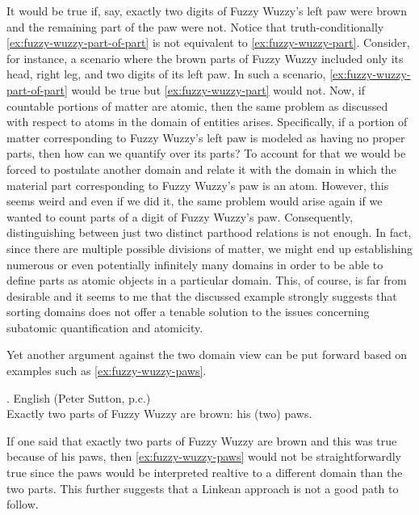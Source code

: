 	It would be true if, say, exactly two digits of Fuzzy Wuzzy's left paw were brown and the remaining part of the paw were not. Notice that truth-conditionally \ref{ex:fuzzy-wuzzy-part-of-part} is not equivalent to \ref{ex:fuzzy-wuzzy-part}. Consider, for instance, a scenario where the brown parts of Fuzzy Wuzzy included only its head, right leg, and two digits of its left paw. In such a scenario, \ref{ex:fuzzy-wuzzy-part-of-part} would be true but \ref{ex:fuzzy-wuzzy-part} would not. Now, if countable portions of matter are atomic, then the same problem as discussed with respect to atoms in the domain of entities arises. Specifically, if a portion of matter corresponding to Fuzzy Wuzzy's left paw is modeled as having no proper parts, then how can we quantify over its parts? To account for that we would be forced to postulate another domain and relate it with the domain in which the material part corresponding to Fuzzy Wuzzy's paw is an atom. However, this seems weird and even if we did it, the same problem would arise again if we wanted to count parts of a digit of Fuzzy Wuzzy's paw. Consequently, distinguishing between just two distinct parthood relations is not enough. In fact, since there are multiple possible divisions of matter, we might end up establishing numerous or even potentially infinitely many domains in order to be able to define parts as atomic objects in a particular domain. This, of course, is far from desirable and it seems to me that the discussed example strongly suggests that sorting domains does not offer a tenable solution to the issues concerning subatomic quantification and atomicity.
	
	Yet another argument against the two domain view can be put forward based on examples such as \ref{ex:fuzzy-wuzzy-paws}.
	
	    \ex. English (Peter Sutton, p.c.)\\
    Exactly two parts of Fuzzy Wuzzy are brown: his (two) paws.\label{ex:fuzzy-wuzzy-paws} 

    If one said that exactly two parts of Fuzzy Wuzzy are brown and this was true because of his paws, then \ref{ex:fuzzy-wuzzy-paws} would not be straightforwardly true since the paws would be interpreted realtive to a different domain than the two parts. This further suggests that a Linkean approach is not a good path to follow. 
	
